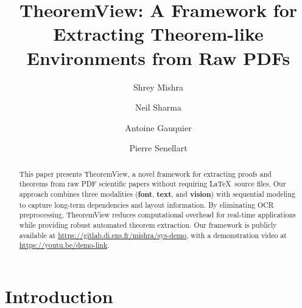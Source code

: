 \documentclass[runningheads]{llncs}
\begin{document}
%
\title{TheoremView: A Framework for Extracting Theorem-like Environments from Raw PDFs}
%
%
\author{Shrey Mishra \and
Neil Sharma \and
Antoine Gauquier \and
Pierre Senellart}



\maketitle              %
%
\begin{abstract}
This paper presents TheoremView, a novel framework for extracting proofs and theorems from raw PDF scientific papers without requiring \LaTeX~source files. Our approach combines three modalities (\textbf{font}, \textbf{text}, and \textbf{vision}) with sequential modeling to capture long-term dependencies and layout information. By eliminating OCR preprocessing, TheoremView reduces computational overhead for real-time applications while providing robust automated theorem extraction. Our framework is publicly available at \url{https://gitlab.di.ens.fr/mishra/sys-demo}, with a demonstration video at \url{https://youtu.be/demo-link}.


\end{abstract}


\section{Introduction}
\end{document}

